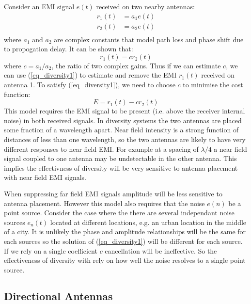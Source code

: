 \documentclass{article}
\begin{document}
Consider an EMI signal $e(t)$ received on two nearby antennas:
\begin{equation}
\begin{split}
r_1(t) &= a_1 e(t) \\
r_2(t) &= a_2 e(t) \\
\end{split}
\end{equation}
where $a_1$ and $a_2$ are complex constants that model path loss and phase shift due to propogation delay. It can be shown that:
\begin{equation} \label{eq_diversity1}
r_1(t) = cr_2(t)
\end{equation}
where $c=a_1/a_2$, the ratio of two complex gains.  Thus if we can estimate $c$, we can use (\ref{eq_diversity1}) to estimate and remove the EMI $r_1(t)$ received on antenna 1. To satisfy (\ref{eq_diversity1}), we need to choose $c$ to minimise the cost function:
\begin{equation} 
E = r_1(t) - cr_2(t)
\end{equation}
This model requires the EMI signal to be present (i.e. above the receiver internal noise) in both received signals. In diversity systems the two antennas are placed some fraction of a wavelength apart. Near field intensity is a strong function of distances of less than one wavelength, so the two antennas are likely to have very different responses to near field EMI. For example at a spacing of $\lambda/4$ a near field signal coupled to one antenna may be undetectable in the other antenna. This implies the effectivness of diversity will be very sensitive to antenna placement with near field EMI signals.

When suppressing far field EMI signals amplitude will be less sensitive to antenna placement. However this model also requires that the noise $e(n)$ be a point source.  Consider the case where the there are several independant noise sources $e_n(t)$ located at different locations, e.g. an urban location in the middle of a city.  It is unlikely the phase and amplitude relationships will be the same for each sources so the solution of (\ref{eq_diversity1}) will be different for each source.  If we rely on a single coefficient $c$ cancellation will be ineffective.  So the effectiveness of diversity with rely on how well the noise resolves to a single point source.

\subsection{Directional Antennas}
\end{document}
